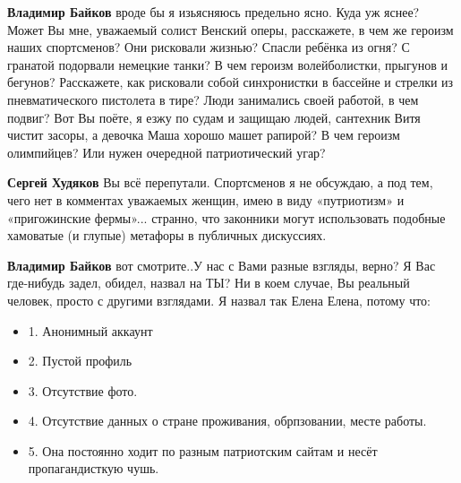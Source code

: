 \begin{itemize}
\begin{itemize}
 
\textbf{Владимир Байков} вроде бы я изьясняюсь предельно ясно. Куда уж яснее?
Может Вы мне, уважаемый солист Венский оперы, расскажете, в чем же героизм
наших спортсменов? Они рисковали жизнью? Спасли ребёнка из огня? С гранатой
подорвали немецкие танки? В чем героизм волейболистки, прыгунов и бегунов?
Расскажете, как рисковали собой синхронистки в бассейне и стрелки из
пневматического пистолета в тире? Люди занимались своей работой, в чем подвиг?
Вот Вы поёте, я езжу по судам и защищаю людей, сантехник Витя чистит засоры, а
девочка Маша хорошо машет рапирой? В чем героизм олимпийцев? Или нужен
очередной патриотический угар?

 
\textbf{Сергей Худяков} Вы всё перепутали. Спортсменов я не обсуждаю, а под
тем, чего нет в комментах уважаемых женщин, имею в виду «путриотизм» и
«пригожинские фермы»... странно, что законники могут использовать подобные
хамоватые (и глупые) метафоры в публичных дискуссиях.

 
\textbf{Владимир Байков} вот смотрите..У нас с Вами разные взгляды, верно? Я
Вас где-нибудь задел, обидел, назвал на ТЫ? Ни в коем случае, Вы реальный
человек, просто с другими взглядами. Я назвал так Елена Елена, потому что:

\begin{itemize}
  \item 1. Анонимный аккаунт
  \item 2. Пустой профиль
  \item 3. Отсутствие фото.
  \item 4. Отсутствие данных о стране проживания, обрпзовании, месте работы.
  \item 5. Она постоянно ходит по разным патриотским сайтам и несёт пропагандисткую чушь.
\end{itemize}


\end{itemize}
\end{itemize}
